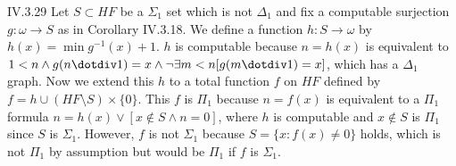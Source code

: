 \documentclass[12pt]{article}
\begin{document}
\begin{customthm}{IV.3.29}
  Let $S\subset HF$ be a $\Sigma_1$ set which is not $\Delta_1$ and fix a computable surjection $g:\omega\rightarrow S$ as in Corollary IV.3.18. We define a function $h:S\rightarrow\omega$ by $h(x)=\min g^{-1}(x)+1$. $h$ is computable because $n=h(x)$ is equivalent to $1<n\wedge g(n\dotdiv1)=x\wedge\neg\exists m<n[g(m\dotdiv1)=x]$, which has a $\Delta_1$ graph. Now we extend this $h$ to a total function $f$ on $HF$ defined by $f=h\cup(HF\setminus S)\times\{0\}$. This $f$ is $\Pi_1$ because $n=f(x)$ is equivalent to a $\Pi_1$ formula $n=h(x)\vee[x\not\in S\wedge n=0]$, where $h$ is computable and $x\not\in S$ is $\Pi_1$ since $S$ is $\Sigma_1$. However, $f$ is not $\Sigma_1$ because $S=\{x:f(x)\neq0\}$ holds, which is not $\Pi_1$ by assumption but would be $\Pi_1$ if $f$ is $\Sigma_1$.
\end{customthm}
\end{document}
